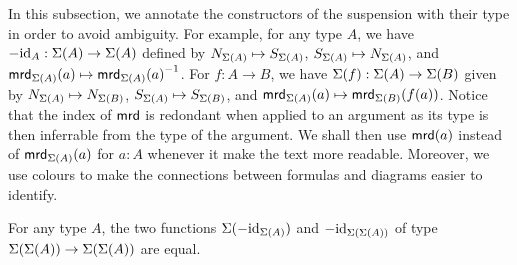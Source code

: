 \documentclass[english,a4]{article}
\begin{document}
In this subsection, we annotate the constructors of the suspension with their type in order to avoid ambiguity.
For example, for any type $A$, we have $-\id_A : \susp(A) \to \susp(A)$ defined by
$N_{\susp(A)} \mapsto S_{\susp(A)}$, $S_{\susp(A)} \mapsto N_{\susp(A)}$, and $\mrd_{\susp(A)}(a) \mapsto \inv{\mrd_{\susp(A)}(a)}$.
For $f : A \to B$, we have $\susp(f) : \susp(A) \to \susp(B)$ given by $N_{\susp(A)} \mapsto N_{\susp(B)}$, $S_{\susp(A)} \mapsto S_{\susp(B)}$, and $\mrd_{\susp(A)}(a) \mapsto \mrd_{\susp(B)}(f(a))$.
Notice that the index of $\mrd$ is redondant when applied to an argument as its type is then inferrable from the type of the argument. We shall then use $\mrd(a)$ instead of $\mrd_{\susp(A)}(a)$ for $a:A$ whenever it make the text more readable.
Moreover, we use colours to make the connections between formulas and diagrams easier to identify.

\begin{lemma} \label{lem:susp-neg-commute}
	For any type $A$, the two functions $\susp(-\id_{\susp(A)})$ and $-\id_{\susp(\susp(A))}$ of type $\susp(\susp(A)) \to \susp(\susp(A))$ are equal.
\end{lemma}
\end{document}
